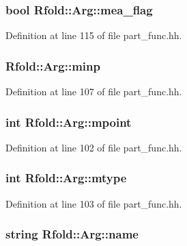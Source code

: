 \hypertarget{class_rfold_1_1_arg_a7b3d1a355bec84586c9832c1858a2f6b}{
\subsubsection[{mea\+\_\+flag}]{\setlength{\rightskip}{0pt plus 5cm}bool Rfold\+::\+Arg\+::mea\+\_\+flag}}\label{class_rfold_1_1_arg_a7b3d1a355bec84586c9832c1858a2f6b}


Definition at line 115 of file part\+\_\+func.\+hh.

\hypertarget{class_rfold_1_1_arg_a4ea3681597506bb5d8b10e2cda9a3ca6}{
\subsubsection[{minp}]{ Rfold\+::\+Arg\+::minp}}\label{class_rfold_1_1_arg_a4ea3681597506bb5d8b10e2cda9a3ca6}


Definition at line 107 of file part\+\_\+func.\+hh.

\hypertarget{class_rfold_1_1_arg_a273269902f8a9b9974c1d46800df16e9}{
\subsubsection[{mpoint}]{\setlength{\rightskip}{0pt plus 5cm}int Rfold\+::\+Arg\+::mpoint}}\label{class_rfold_1_1_arg_a273269902f8a9b9974c1d46800df16e9}


Definition at line 102 of file part\+\_\+func.\+hh.

\hypertarget{class_rfold_1_1_arg_a9736867f9aac222c47efa0b5218fc8fa}{
\subsubsection[{mtype}]{\setlength{\rightskip}{0pt plus 5cm}int Rfold\+::\+Arg\+::mtype}}\label{class_rfold_1_1_arg_a9736867f9aac222c47efa0b5218fc8fa}


Definition at line 103 of file part\+\_\+func.\+hh.

\hypertarget{class_rfold_1_1_arg_a38ab74cced49339e67fe8f70bb6827fb}{
\subsubsection[{name}]{\setlength{\rightskip}{0pt plus 5cm}string Rfold\+::\+Arg\+::name}}\label{class_rfold_1_1_arg_a38ab74cced49339e67fe8f70bb6827fb}


